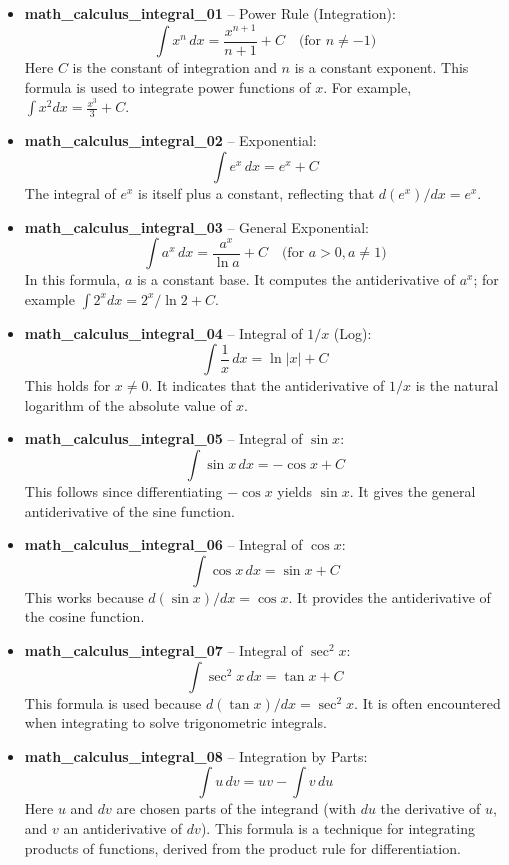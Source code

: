 \documentclass[11pt,a4paper]{article}
\begin{document}
\begin{itemize}
\item \textbf{math\_calculus\_integral\_01} -- Power Rule (Integration): 
\[\int x^n\,dx = \frac{x^{n+1}}{n+1} + C \quad \text{(for } n \neq -1\text{)}\]
Here $C$ is the constant of integration and $n$ is a constant exponent. This formula is used to integrate power functions of $x$. For example, $\int x^2 dx = \frac{x^3}{3}+C$.

\item \textbf{math\_calculus\_integral\_02} -- Exponential: 
\[\int e^x\,dx = e^x + C\]
The integral of $e^x$ is itself plus a constant, reflecting that $d(e^x)/dx = e^x$.

\item \textbf{math\_calculus\_integral\_03} -- General Exponential: 
\[\int a^x\,dx = \frac{a^x}{\ln a} + C \quad \text{(for } a>0, a \neq 1\text{)}\]
In this formula, $a$ is a constant base. It computes the antiderivative of $a^x$; for example $\int 2^x dx = 2^x/\ln 2 + C$.

\item \textbf{math\_calculus\_integral\_04} -- Integral of $1/x$ (Log): 
\[\int \frac{1}{x}\,dx = \ln|x| + C\]
This holds for $x \neq 0$. It indicates that the antiderivative of $1/x$ is the natural logarithm of the absolute value of $x$.

\item \textbf{math\_calculus\_integral\_05} -- Integral of $\sin x$: 
\[\int \sin x\,dx = -\cos x + C\]
This follows since differentiating $-\cos x$ yields $\sin x$. It gives the general antiderivative of the sine function.

\item \textbf{math\_calculus\_integral\_06} -- Integral of $\cos x$: 
\[\int \cos x\,dx = \sin x + C\]
This works because $d(\sin x)/dx = \cos x$. It provides the antiderivative of the cosine function.

\item \textbf{math\_calculus\_integral\_07} -- Integral of $\sec^2 x$: 
\[\int \sec^2 x\,dx = \tan x + C\]
This formula is used because $d(\tan x)/dx = \sec^2 x$. It is often encountered when integrating to solve trigonometric integrals.

\item \textbf{math\_calculus\_integral\_08} -- Integration by Parts: 
\[\int u\,dv = uv - \int v\,du\]
Here $u$ and $dv$ are chosen parts of the integrand (with $du$ the derivative of $u$, and $v$ an antiderivative of $dv$). This formula is a technique for integrating products of functions, derived from the product rule for differentiation.


\end{itemize}
\end{document}
